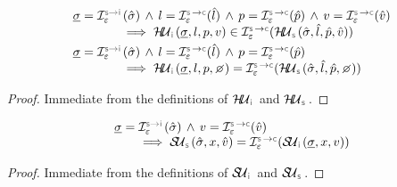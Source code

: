 \begin{lemma}\label{lemma:soundiness:heap:update}
$$
\begin{array}{l}
\istate = \interpret{\symbinst}{\senv}(\sstate) \, \wedge \, 
   \loc = \interpret{\symbconc}{\senv}(\sloc)  \, \wedge \, 
   p = \interpret{\symbconc}{\senv}(\sexprp)  \, \wedge \, 
   \val = \interpret{\symbconc}{\senv}(\sexprv)   \\  \qquad \qquad
       \implies \hpupdt{\instrumented}(\istate, \loc, p, \val) \in \interpret{\symbconc}{\senv}(\hpupdt{\symbolic}(\sstate, \sloc, \sexprp, \sexprv)) \\[3pt]
%       
\istate = \interpret{\symbinst}{\senv}(\sstate) \, \wedge \, 
   \loc = \interpret{\symbconc}{\senv}(\sloc)  \, \wedge \, 
   p = \interpret{\symbconc}{\senv}(\sexprp) \\  \qquad \qquad
  \implies \hpupdt{\instrumented}(\istate, \loc, p, \none) = \interpret{\symbconc}{\senv}(\hpupdt{\symbolic}(\sstate, \sloc, \sexprp, \none)) 
\end{array}
$$
\end{lemma}
\begin{proof}
Immediate from the definitions of $\hpupdt{\instrumented}$ and $\hpupdt{\symbolic}$.
\end{proof}


\begin{lemma}\label{lemma:soundiness:store:update}
$$
\begin{array}{l}
\istate = \interpret{\symbinst}{\senv}(\sstate) \, \wedge \, 
   \val = \interpret{\symbconc}{\senv}(\sexprv) \\ \qquad   
       \implies \stupdt{\symbolic}(\sstate, \jvar, \sexprv) = \interpret{\symbconc}{\senv}(\stupdt{\instrumented}(\istate, \jvar, \val)) 
\end{array}
$$
\end{lemma}
\begin{proof}
Immediate from the definitions of $\stupdt{\instrumented}$ and $\stupdt{\symbolic}$.
\end{proof}


